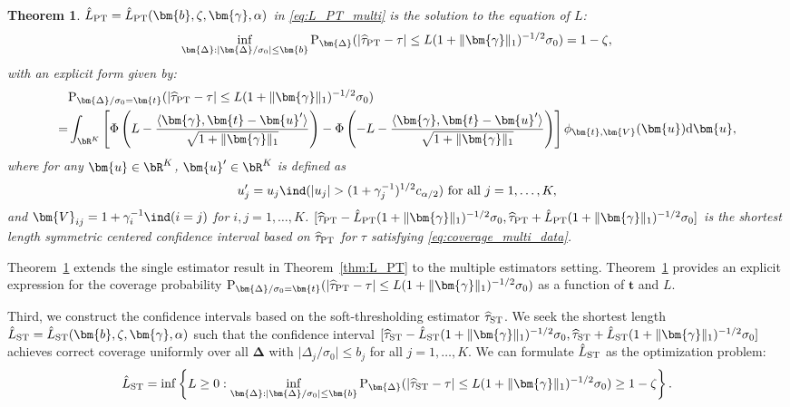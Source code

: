 \documentclass[11pt]{article}
\def\P{{\mathrm P}}
\def\d{{\mathrm d}}
\newcommand{\htau}{\widehat\tau}
\numberwithin{equation}{section}
\newtheorem{theorem}{Theorem}[section]
\theoremstyle{definition}
\begin{document}
\begin{theorem}\label{thm:L_PT_multi}
  $\hat{L}_{\rm PT} = \hat{L}_{\rm PT}(\bm{b}, \zeta, \bm{\gamma}, \alpha)$ in \eqref{eq:L_PT_multi} is the solution to the equation of $L$:
  \begin{align*}
    \inf_{\bm{\Delta}: \lvert \bm{\Delta}/\sigma_0 \rvert \le \bm{b}} \P_{\bm{\Delta}}(\lvert \htau_{\rm PT}- \tau \rvert \le L (1+\lVert \bm{\gamma} \rVert_1)^{-1/2} \sigma_0) = 1-\zeta,
  \end{align*} 
  with an explicit form given by:
  \begin{align*}
    &\P_{\bm{\Delta}/\sigma_0 = \bm{t}}(\lvert \htau_{\rm PT}- \tau \rvert \le L (1+\lVert \bm{\gamma} \rVert_1)^{-1/2} \sigma_0) \\
    =& \int_{\bR^K} \left[\Phi\left(L - \frac{\langle \bm{\gamma}, \bm{t} - \bm{u}' \rangle}{\sqrt{1+\lVert \bm{\gamma} \rVert_1}}  \right) - \Phi\left(-L - \frac{\langle \bm{\gamma}, \bm{t} - \bm{u}' \rangle}{\sqrt{1+\lVert \bm{\gamma} \rVert_1}} \right)\right] \phi_{\bm{t}, \bm{V}}(\bm{u}) \d \bm{u},
  \end{align*}
  where for any $\bm{u} \in \bR^K$, $\bm{u}' \in \bR^K$ is defined as
  \[
    u_j' = u_j \ind(\lvert u_j \rvert > (1+\gamma_j^{-1})^{1/2} c_{\alpha/2}) \text{ for all } j=1,\ldots,K,
  \]
  and $\bm{V}_{ij} = 1 + \gamma_i^{-1} \ind (i=j)$ for $i,j=1,\ldots,K$. $[\htau_{\rm PT}- \hat{L}_{\rm PT} (1+\lVert \bm{\gamma} \rVert_1)^{-1/2} \sigma_0, \htau_{\rm PT}+ \hat{L}_{\rm PT} (1+\lVert \bm{\gamma} \rVert_1)^{-1/2} \sigma_0]$ is the shortest length symmetric centered confidence interval based on $\htau_{\rm PT}$ for $\tau$ satisfying \eqref{eq:coverage_multi_data}.
\end{theorem}

Theorem~\ref{thm:L_PT_multi} extends the single estimator result in Theorem~\ref{thm:L_PT} to the multiple estimators setting. Theorem~\ref{thm:L_PT_multi} provides an explicit expression for the coverage probability $\P_{\bm{\Delta}/\sigma_0 = \bm{t}}(\lvert \htau_{\rm PT}- \tau \rvert \le L (1+\lVert \bm{\gamma} \rVert_1)^{-1/2} \sigma_0)$ as a function of $\bm{t}$ and $L$.

Third, we construct the confidence intervals based on the soft-thresholding estimator $\htau_{\rm ST}$. We seek the shortest length $\hat{L}_{\rm ST} = \hat{L}_{\rm ST}(\bm{b}, \zeta, \bm{\gamma}, \alpha)$ such that the confidence interval $[\htau_{\rm ST}- \hat{L}_{\rm ST} (1+\lVert \bm{\gamma} \rVert_1)^{-1/2} \sigma_0, \htau_{\rm ST}+ \hat{L}_{\rm ST} (1+\lVert \bm{\gamma} \rVert_1)^{-1/2} \sigma_0]$ achieves correct coverage uniformly over all $\bm{\Delta}$ with $\lvert \Delta_j/\sigma_0 \rvert \le b_j$ for all $j=1,\ldots,K$. We can formulate $\hat{L}_{\rm ST}$ as the optimization problem:
\begin{align}\label{eq:L_multi}
  \hat{L}_{\rm ST} = \inf \left\{ L \ge 0: \inf_{\bm{\Delta}: \lvert \bm{\Delta}/\sigma_0 \rvert \le \bm{b}} \P_{\bm{\Delta}}(\lvert \htau_{\rm ST}- \tau \rvert \le L (1+\lVert \bm{\gamma} \rVert_1)^{-1/2} \sigma_0) \ge 1-\zeta \right\}. 
\end{align}
\end{document}

